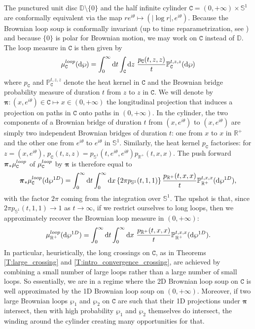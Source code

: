 \documentclass[11pt]{article}
\theoremstyle{remark}
\newcommand{\R}{\mathbb{R}}
\newcommand{\D}{\mathbb{D}}
\renewcommand{\P}{\mathbb{P}}
\renewcommand{\d}{\mathrm{d}}
\newcommand{\cyl}{\mathtt{C}}
\def \loopmeasure{\mu^{\rm loop}}
\numberwithin{equation}{section}
\begin{document}
The punctured unit disc $\D \setminus \{0\}$ and the half infinite cylinder $\cyl = (0,+\infty) \times \mathbb{S}^1$ are conformally equivalent via the map $r e^{i\theta} \mapsto (|\log r|, e^{i \theta})$. Because the Brownian loop soup is conformally invariant (up to time reparametrization, see \cite[Proposition 5.27]{LawlerConformallyInvariantProcesses}) and because $\{0\}$ is polar for Brownian motion, we may work on $\cyl$ instead of $\D$.
The loop measure in $\cyl$ is then given by
\[
\loopmeasure_\cyl(\d \wp) = \int_0^\infty \d t \int_{\cyl} \d z~ 
\dfrac{p_{\cyl}(t,z,z)}{t} \P_\cyl^{t,z,z}(\d \wp)
\]
where $p_{\cyl}$ and $\P_\cyl^{t,z,z}$ denote the heat kernel in $\cyl$ and the Brownian bridge probability measure of duration $t$ from $z$ to $z$ in $\cyl$.
We will denote by $\boldsymbol{\pi} : (x,e^{i\theta}) \in \cyl \mapsto x \in (0,+\infty)$ the longitudinal projection that induces a projection on paths in $\cyl$ onto paths in $(0,+\infty)$. 
In the cylinder, the two components of a Brownian bridge of duration $t$ from $(x, e^{i\theta})$ to $(x, e^{i\theta})$ are simply two independent Brownian bridges of duration $t$: one from $x$ to $x$ in $\R^+$ and the other one from $e^{i\theta}$ to $e^{i\theta}$ in $\mathbb{S}^1$. Similarly, the heat kernel $p_\cyl$ factorises: for $z = (x, e^{i\theta})$, $p_{\cyl}(t,z,z) = p_{\mathbb{S}^1}(t,e^{i\theta},e^{i\theta}) p_{\R^+}(t,x,x)$.
The push forward $\boldsymbol{\pi}_* \loopmeasure_\cyl$ of $\loopmeasure_\cyl$ by $\boldsymbol{\pi}$ is therefore equal to
\begin{equation}
\label{E:1D_2D}
\boldsymbol{\pi}_* \loopmeasure_\cyl(\d \wp^{\rm 1D}) = \int_0^\infty \d t \int_0^\infty \d x \left\{ 2\pi p_{\mathbb{S}^1}(t,1,1) \right\} \frac{p_{\R^+}(t,x,x)}{t} \P_{\R^+}^{t,x,x}( \d \wp^{\rm 1D} ),
\end{equation}
with the factor $2\pi$ coming from the integration over $\mathbb{S}^1$.
The upshot is that, since $2 \pi p_{\mathbb{S}^1}(t,1,1) \to 1$ as $t \to \infty$, if we restrict ourselves to long loops, then we approximately recover the Brownian loop measure in $(0,+\infty)$:
\[
\loopmeasure_{\R^+}(\d \wp^{\rm 1D}) = \int_0^\infty \d t \int_0^\infty \d x~ \frac{p_{\R^+}(t,x,x)}{t} \P_{\R^+}^{t,x,x}(\d \wp^{\rm 1D}).
\]
In particular, heuristically, the long crossings on $\cyl$, 
as in Theorems \ref{T:large_crossing} and \ref{T:intro_convergence_crossing},
are achieved by combining a small number of large loops rather than a large number of small loops. 
So essentially, we are in a regime where the 2D Brownian loop soup on $\cyl$
is well approximated by the 1D Brownian loop soup on $(0,+\infty)$.
Moreover, if two large Brownian loops $\wp_1$ and $\wp_2$ on $\cyl$
are such that their 1D projections under $\boldsymbol{\pi}$ intersect, 
then with high probability $\wp_{1}$ and $\wp_{2}$ themselves do intersect, 
the winding around the cylinder creating many opportunities for that. 
\end{document}
